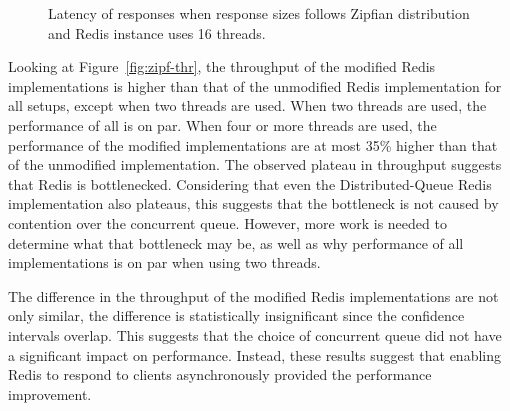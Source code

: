 \documentclass[sigconf, screen]{acmart}
\begin{document}
\begin{figure}[th]
\caption{Latency of responses when response sizes follows Zipfian distribution and Redis instance uses 16 threads.}
\label{fig:zipf-latency}
\end{figure}

Looking at Figure~\ref{fig:zipf-thr}, the throughput of the modified Redis implementations is higher than that of the unmodified Redis implementation for all setups, except when two threads are used.
When two threads are used, the performance of all is on par.
When four or more threads are used, the performance of the modified implementations are at most 35\% higher than that of the unmodified implementation.
The observed plateau in throughput suggests that Redis is bottlenecked.
Considering that even the Distributed-Queue Redis implementation also plateaus, this suggests that the bottleneck is not caused by contention over the concurrent queue.
However, more work is needed to determine what that bottleneck may be, as well as why performance of all implementations is on par when using two threads.

The difference in the throughput of the modified Redis implementations are not only similar, the difference is statistically insignificant since the confidence intervals overlap.
This suggests that the choice of concurrent queue did not have a significant impact on performance.
Instead, these results suggest that enabling Redis to respond to clients asynchronously provided the performance improvement.
\end{document}
